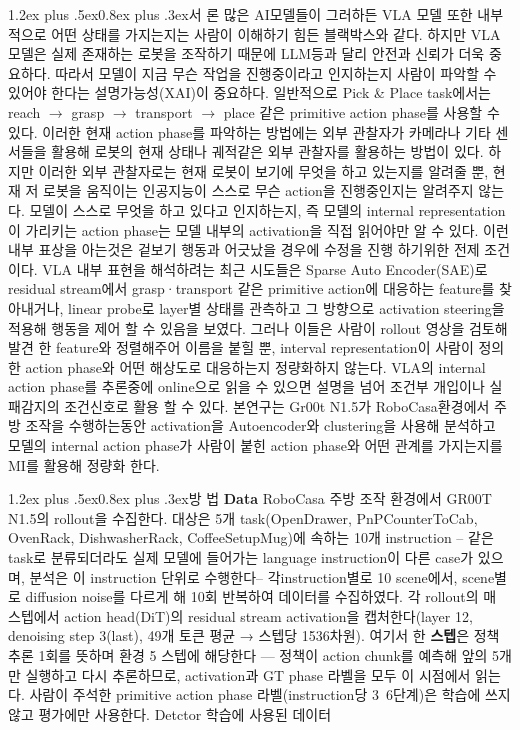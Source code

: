 \documentclass[a4paper,twocolumn,9pt]{extarticle}
\makeatletter
\renewcommand\section{\@startsection{section}{1}{\z@}%
  {1.2ex plus .5ex}{0.8ex plus .3ex}{\centering\normalsize\bfseries}}
\makeatother
\begin{document}
\section{서 론}
많은 AI모델들이 그러하든 VLA 모델 또한 내부적으로 어떤 상태를 가지는지는 사람이 이해하기 힘든 블랙박스와 같다.  하지만 VLA모델은 실제 존재하는 로봇을 조작하기 때문에 LLM등과 달리 안전과 신뢰가 더욱 중요하다. 따라서 모델이 지금 무슨 작업을 진행중이라고 인지하는지 사람이 파악할 수 있어야 한다는 설명가능성(XAI)이 중요하다. 일반적으로 Pick \& Place task에서는 reach $\rightarrow$ grasp $\rightarrow$ transport $\rightarrow$ place 같은 primitive action phase를 사용할 수 있다. 이러한 현재 action phase를 파악하는 방법에는 외부 관찰자가 카메라나 기타 센서들을 활용해 로봇의 현재 상태나 궤적같은 외부 관찰자를 활용하는 방법이 있다. 하지만 이러한 외부 관찰자로는 현재 로봇이 보기에 무엇을 하고 있는지를 알려줄 뿐, 현재 저 로봇을 움직이는 인공지능이 스스로 무슨 action을 진행중인지는 알려주지 않는다. 모델이 스스로 무엇을 하고 있다고 인지하는지, 즉 모델의 internal representation이 가리키는 action phase는 모델 내부의 activation을 직접 읽어야만 알 수 있다. 이런 내부 표상을 아는것은 겉보기 행동과 어긋났을 경우에 수정을 진행 하기위한 전제 조건이다. VLA 내부 표현을 해석하려는 최근 시도들은
Sparse Auto Encoder(SAE)로 residual stream에서 grasp·transport 같은 primitive action에 대응하는 feature를 찾아내거나, linear probe로 layer별 상태를 관측하고 그 방향으로 activation steering을 적용해 행동을 제어 할 수 있음을 보였다. 그러나 이들은 사람이 rollout 영상을 검토해 발견 한 feature와 정렬해주어 이름을 붙힐 뿐, interval representation이 사람이 정의한 action phase와 어떤 해상도로 대응하는지 정량화하지 않는다. VLA의 internal action phase를 추론중에 online으로 읽을 수 있으면 설명을 넘어 조건부 개입이나 실패감지의 조건신호로 활용 할 수 있다. 본연구는 Gr00t N1.5가 RoboCasa환경에서 주방 조작을 수행하는동안 activation을 Autoencoder와 clustering을 사용해 분석하고 모델의 internal action phase가 사람이 붙힌 action phase와 어떤 관계를 가지는지를 MI를 활용해 정량화 한다. 

\section{방 법}
\textbf{Data} RoboCasa 주방 조작 환경에서 GR00T N1.5의 rollout을 수집한다.
대상은 5개 task(OpenDrawer, PnPCounterToCab, OvenRack, DishwasherRack,
CoffeeSetupMug)에 속하는 10개 instruction -- 같은 task로 분류되더라도 실제 모델에 들어가는 language instruction이 다른 case가 있으며, 분석은 이 instruction 단위로 수행한다-- 각instruction별로 10 scene에서, scene별로 diffusion noise를 다르게 해 10회 반복하여 데이터를 수집하였다. 각 rollout의 매 스텝에서 action head(DiT)의 residual stream activation을 캡처한다(layer 12, denoising step 3(last), 49개 토큰 평균 → 스텝당 1536차원). 여기서 한 \textbf{스텝}은 정책 추론 1회를 뜻하며 환경 5 스텝에 해당한다 --- 정책이 action chunk를 예측해 앞의 5개만 실행하고 다시 추론하므로, activation과 GT phase 라벨을 모두 이 시점에서 읽는다. 사람이 주석한 primitive action phase 라벨(instruction당 3~6단계)은 학습에 쓰지 않고 평가에만 사용한다. Detctor 학습에 사용된 데이터 %
\end{document}
